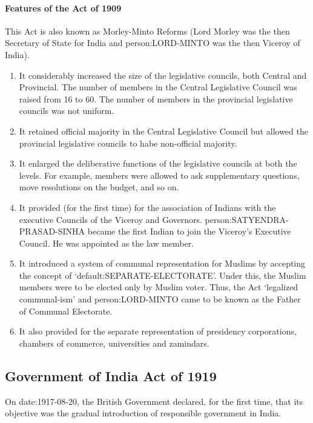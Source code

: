 \begin{multicol}{2}
\paragraph{Features of the Act of 1909}
This Act is also known as Morley-Minto Reforms (Lord Morley was the then Secretary of State for India and \gls{person:LORD-MINTO} was the then Viceroy of India).
\begin{enumerate}
  \item It considerably increased the size of the legislative councils, both Central and Provincial. The number of members in the Central Legislative Council was raised from 16 to 60. The number of members in the provincial legislative councils was not uniform.
  \item It retained official majority in the Central Legislative Council but allowed the provincial legislative councils to habe non-official majority.
  \item It enlarged the deliberative functions of the legislative councils at both the levels. For example, members were allowed to ask supplementary questions, move resolutions on the budget, and so on.
  \item It provided (for the first time) for the association of Indians with the executive Councils of the Viceroy and Governors. \gls{person:SATYENDRA-PRASAD-SINHA} became the first Indian to join the Viceroy's Executive Council. He was appointed as the law member.
  \item It introduced a system of communal representation for Muslims by accepting the concept of `\gls{default:SEPARATE-ELECTORATE}'. Under this, the Muslim members were to be elected only by Muslim voter. Thus, the Act `legalized communal-ism' and \gls{person:LORD-MINTO} came to be known as the Father of Communal Electorate.
  \item It also provided for the separate representation of presidency corporations, chambers of commerce, universities and zamindars.
\end{enumerate}

\subsection{Government of India Act of 1919}

On \gls{date:1917-08-20}, the British Government declared, for the first time, that its objective was the gradual introduction of responsible government in India.


\end{multicol}
